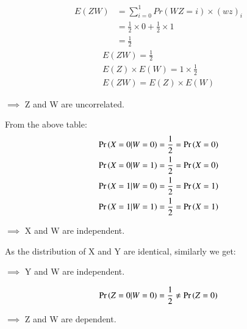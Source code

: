 \documentclass[journal,12pt,twocolumn]{IEEEtran}
\theoremstyle{definition}
\begin{document}
\begin{align}
E(ZW) &= \sum_{i = 0}^{1} Pr(WZ=i) \times (wz)_{i}\\
&= \frac{1}{2} \times 0 + \frac{1}{2} \times 1\\
&= \frac{1}{2}
\end{align}
\begin{align}
    E(ZW) = \frac{1}{2}\\
    E(Z)\times E(W) = 1 \times \frac{1}{2}\\
    E(ZW) = E(Z)\times E(W)
\end{align}
\begin{center}
   $\implies$ Z and W are uncorrelated.
\end{center}
From the above table:
\begin{align}
    \Pr\left(X = 0 | W = 0\right) = \frac{1}{2} = \Pr\left(X = 0\right)\\
    \Pr\left(X = 0 | W = 1\right) = \frac{1}{2} = \Pr\left(X = 0\right)\\
    \Pr\left(X = 1 | W = 0\right) = \frac{1}{2} = \Pr\left(X = 1\right)\\
    \Pr\left(X = 1 | W = 1\right) = \frac{1}{2} = \Pr\left(X = 1\right)
\end{align}
\begin{center}
   $\implies$ X and W are independent. 
\end{center}
As the distribution of X and Y are identical, similarly we get:
\begin{center}
   $\implies$ Y and W are independent. 
\end{center}
\begin{align}
    \Pr\left(Z = 0 | W = 0\right) = \frac{1}{2} \neq \Pr\left(Z = 0\right)
\end{align}
\begin{center}
   $\implies$ Z and W are dependent. 
\end{center}
\bigskip
{}
\end{document}
